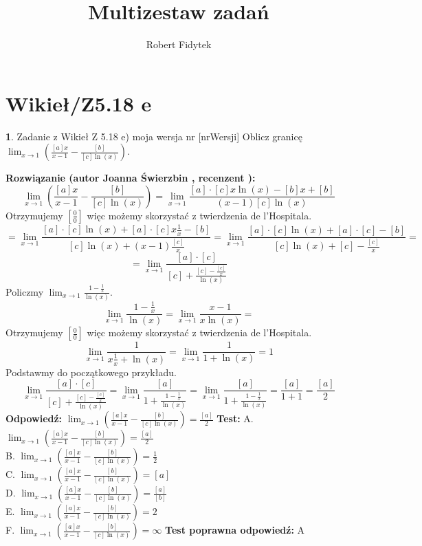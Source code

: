 \documentclass[12pt, a4paper]{article}
\title{Multizestaw zadań}
\author{Robert Fidytek}
\date{}
\theoremstyle{definition} %
\newtheorem{zad}{}
\newcommand{\kategoria}[1]{\section{#1}} %
\newcommand{\zadStart}[1]{\begin{zad}#1\newline} %
\newcommand{\zadStop}{\end{zad}}   %
\newcommand{\rozwStart}[2]{\noindent \textbf{Rozwiązanie (autor #1 , recenzent #2): }\newline} %
\newcommand{\rozwStop}{\newline}                                            %
\newcommand{\odpStart}{\noindent \textbf{Odpowiedź:}\newline}    %
\newcommand{\odpStop}{\newline}                                             %
\newcommand{\testStart}{\noindent \textbf{Test:}\newline} %
\newcommand{\testStop}{\newline} %
\newcommand{\kluczStart}{\noindent \textbf{Test poprawna odpowiedź:}\newline} %
\newcommand{\kluczStop}{\newline} %
\begin{document}
\maketitle


\kategoria{Wikieł/Z5.18 e}
\zadStart{Zadanie z Wikieł Z 5.18 e) moja wersja nr [nrWersji]}
Oblicz granicę $\lim_{x \rightarrow 1} \left( \frac{[a]x}{x-1}-\frac{[b]}{[c]\ln(x)} \right)$.
\zadStop
\rozwStart{Joanna Świerzbin}{}
$$\lim_{x \rightarrow 1} \left( \frac{[a]x}{x-1}-\frac{[b]}{[c]\ln(x)} \right) = \lim_{x \rightarrow 1}  \frac{[a]\cdot[c]x\ln(x)-[b]x+[b]}{(x-1)[c]\ln(x)} $$
Otrzymujemy $ \left[ \frac{0}{0} \right] $ więc możemy skorzystać z twierdzenia de l'Hospitala.
$$ = \lim_{x \rightarrow 1}  \frac{[a]\cdot[c]\ln(x)+[a]\cdot[c]x\frac{1}{x}-[b]}{[c]\ln(x)+(x-1)\frac{[c]}{x}} =  
 \lim_{x \rightarrow 1}  \frac{[a]\cdot[c]\ln(x)+[a]\cdot[c]-[b]}{[c]\ln(x)+[c]-\frac{[c]}{x}} =$$
$$ = \lim_{x \rightarrow 1}  \frac{[a]\cdot[c]}{[c]+\frac{[c]-\frac{[c]}{x}}{\ln(x)}} $$
Policzmy $ \lim_{x \rightarrow 1}  \frac{1-\frac{1}{x}}{\ln(x)} $.
$$ \lim_{x \rightarrow 1}  \frac{1-\frac{1}{x}}{\ln(x)} = \lim_{x \rightarrow 1}  \frac{x-1}{x\ln(x)} =$$
Otrzymujemy $ \left[ \frac{0}{0} \right] $ więc możemy skorzystać z twierdzenia de l'Hospitala.
$$ \lim_{x \rightarrow 1}  \frac{1}{x\frac{1}{x}+\ln(x)} = \lim_{x \rightarrow 1}  \frac{1}{1+\ln(x)} =1$$
Podstawmy do początkowego przykładu.
$$\lim_{x \rightarrow 1}  \frac{[a]\cdot[c]}{[c]+\frac{[c]-\frac{[c]}{x}}{\ln(x)}} =\lim_{x \rightarrow 1}  \frac{[a]}{1+\frac{1-\frac{1}{x}}{\ln(x)}} =\lim_{x \rightarrow 1}  \frac{[a]}{1+\frac{1-\frac{1}{x}}{\ln(x)}} =  \frac{[a]}{1+1} = \frac{[a]}{2}$$
\rozwStop
\odpStart
$\lim_{x \rightarrow 1} \left( \frac{[a]x}{x-1}-\frac{[b]}{[c]\ln(x)} \right) = \frac{[a]}{2} $
\odpStop
\testStart
A. $\lim_{x \rightarrow 1} \left( \frac{[a]x}{x-1}-\frac{[b]}{[c]\ln(x)} \right) = \frac{[a]}{2} $\\
B. $\lim_{x \rightarrow 1} \left( \frac{[a]x}{x-1}-\frac{[b]}{[c]\ln(x)} \right) = \frac{1}{2} $\\
C. $\lim_{x \rightarrow 1} \left( \frac{[a]x}{x-1}-\frac{[b]}{[c]\ln(x)} \right) = [a] $\\
D. $\lim_{x \rightarrow 1} \left( \frac{[a]x}{x-1}-\frac{[b]}{[c]\ln(x)} \right) = \frac{[a]}{[b]} $\\
E. $\lim_{x \rightarrow 1} \left( \frac{[a]x}{x-1}-\frac{[b]}{[c]\ln(x)} \right) = 2 $\\
F. $\lim_{x \rightarrow 1} \left( \frac{[a]x}{x-1}-\frac{[b]}{[c]\ln(x)} \right) = \infty $
\testStop
\kluczStart
A
\kluczStop
\end{document}
